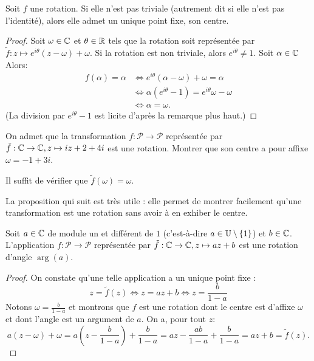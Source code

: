\begin{proposition}
Soit $f$ une rotation. Si elle n'est pas triviale (autrement dit si elle n'est pas l'identité), alors elle admet un unique point fixe, son centre.
\end{proposition}

\begin{proof}
Soit $\omega\in\mathbb{C}$ et $\theta\in\mathbb{R}$ tels que la rotation soit représentée par $\tilde f : z\mapsto e^{i\theta}(z-\omega)+\omega$. Si la rotation est non triviale, alors $e^{i\theta}\neq 1$. Soit $\alpha\in\mathbb{C}$ Alors:
\begin{align*}
f(\alpha)=\alpha
&\iff e^{i\theta}(\alpha-\omega)+\omega=\alpha\\
&\iff \alpha(e^{i\theta}-1)=e^{i\theta}\omega-\omega\\
&\iff \alpha = \omega.
\end{align*}
(La division par $e^{i\theta}-1$ est licite d'après la remarque plus haut.)
\end{proof}

\begin{exercice}
On admet que la transformation $f:\mathcal P\to \mathcal P$ représentée par $\tilde f :\mathbb{C}\to\mathbb{C},  z\mapsto iz+2+4i$ est une rotation. Montrer que son centre a pour affixe $\omega=-1+3i$.
\end{exercice}
\begin{red}
Il suffit de vérifier que $\tilde f(\omega)=\omega$.
\end{red}

\begin{mdframed}
La proposition qui suit est très utile : elle permet de montrer facilement qu'une transformation est une rotation sans avoir à en exhiber le centre.
\end{mdframed}

\begin{proposition}
Soit $a\in\mathbb{C}$ de module un et différent de $1$ (c'est-à-dire $a\in\mathbb{U}\setminus \{1\}$) et $b\in\mathbb{C}$. L'application $f : \mathcal P\to \mathcal P$ représentée par $\tilde f :\mathbb{C}\to \mathbb{C},  z\mapsto az+b$ est une rotation d'angle $\arg(a)$.
\end{proposition}
\begin{proof}
On constate qu'une telle application a un unique point fixe : 
\[ z=\tilde f(z) \iff z=az+b \iff z=\frac{b}{1-a}\]
Notons $\omega=\frac{b}{1-a}$ et montrons que $f$ est une rotation dont le centre est d'affixe $\omega$ et dont l'angle est un argument de $a$. On a, pour tout $z$:
\[ a(z-\omega)+\omega=a\left(z-\frac{b}{1-a}\right)+\frac{b}{1-a}=az-\frac{ab}{1-a}+\frac{b}{1-a} = az+b = \tilde f(z).\]
\end{proof}





